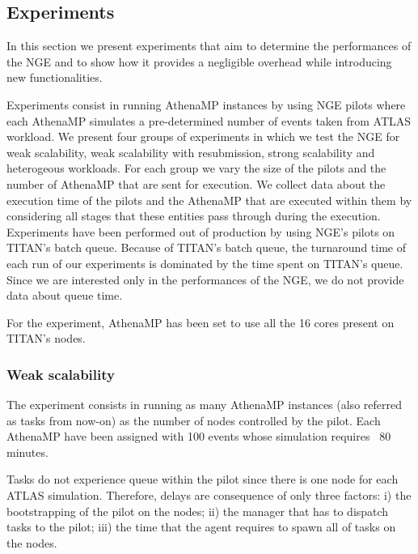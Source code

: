 
\subsection{Experiments}

In this section we present experiments that aim to determine the performances of the NGE and to show how it provides a negligible overhead while introducing new functionalities.

Experiments consist in running AthenaMP instances by using NGE pilots where each AthenaMP simulates a pre-determined number of events taken from ATLAS workload.	
We present four groups of experiments in which we test the NGE for weak scalability, weak scalability with resubmission, strong scalability and heterogeous workloads.
For each group we vary the size of the pilots and the number of AthenaMP that are sent for execution. 
We collect data about the execution time of the pilots and the AthenaMP that are executed within them by considering all stages that these entities pass through during the execution.
Experiments have been performed out of production by using NGE's pilots on TITAN's batch queue. 
Because of TITAN's batch queue, the turnaround time of each run of our experiments is dominated by the time spent on TITAN's queue. Since we are interested only in the performances of the NGE, we do not provide data about queue time.

For the experiment, AthenaMP has been set to use all the 16 cores present on TITAN's nodes. 


\subsubsection{Weak scalability}

The experiment consists in running as many AthenaMP instances (also referred as tasks from now-on) as the number of nodes controlled by the pilot. Each AthenaMP have been assigned with 100 events whose simulation requires  ~$80$ minutes. 
 
Tasks do not experience queue within the pilot since there is one node for each ATLAS simulation. Therefore, delays are consequence of only three factors: i) the bootstrapping of the pilot on the nodes; ii) the manager that has to dispatch tasks to the pilot; iii) the time that the agent requires to spawn all of tasks on the nodes.

